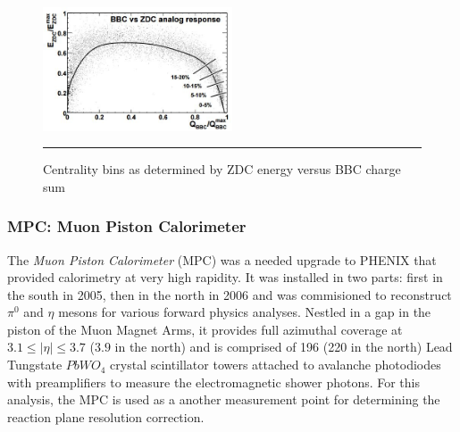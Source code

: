 \begin{figure}[h!]
  \centering
    \includegraphics[width=0.5\textwidth]{prevplots/bbczdcanaresponse.JPG}
    \rule{35em}{0.5pt}
  \caption[Centrality bins as determined by ZDC energy versus BBC charge sum]{Centrality bins as determined by ZDC energy versus BBC charge sum\citep{Ghosh2001}}
  \label{fig:zdcvsbbc}
\end{figure}

\subsubsection{MPC: Muon Piston Calorimeter}
The \textit{Muon Piston Calorimeter} (MPC) was a needed upgrade to PHENIX that provided calorimetry at very high rapidity\citep{kleinjanthesis}. It was installed in two parts: first in the south in 2005, then in the north in 2006 and was commisioned to reconstruct $\pi^{0}$ and $\eta$ mesons for various forward physics analyses. Nestled in a gap in the piston of the Muon Magnet Arms, it provides full azimuthal coverage at $3.1 \leq  | \eta | \leq 3.7$ ($3.9$ in the north) and is comprised of 196 (220 in the north) Lead Tungstate $PbWO_4$ crystal scintillator towers attached to avalanche photodiodes with preamplifiers to measure the electromagnetic shower photons. For this analysis, the MPC is used as a another measurement point for determining the reaction plane resolution correction. 

